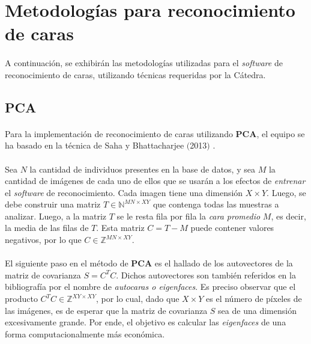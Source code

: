 \documentclass[12pt, twocolumn]{article}
\begin{document}
	\section{Metodologías para reconocimiento de caras}
	
	\paragraph{} A continuación, se exhibirán las metodologías utilizadas para el \textit{software} de reconocimiento de caras, utilizando técnicas requeridas por la Cátedra. 	
	
	\subsection{PCA}
	
	\paragraph{} Para la implementación de reconocimiento de caras utilizando \textbf{PCA}, el equipo se ha basado en la técnica de Saha y Bhattacharjee $($2013$)$ \cite{PCA}.
	
	\paragraph{} Sea $N$ la cantidad de individuos presentes en la base de datos, y sea $M$ la cantidad de imágenes de cada uno de ellos que se usarán a los efectos de \textit{entrenar} el \textit{software} de reconocimiento. Cada imagen tiene una dimensión $X\times Y$. Luego, se debe construir una matriz $T \in \mathbb{N}^{MN\times XY}$ que contenga todas las muestras a analizar. Luego, a la matriz $T$ se le resta fila por fila la \textit{cara promedio} $M$, es decir, la media de las filas de $T$. Esta matriz $C = T - M$ puede contener valores negativos, por lo que $C \in \mathbb{Z}^{MN\times XY}$.
	
	\paragraph{} El siguiente paso en el método de \textbf{PCA} es el hallado de los autovectores de la matriz de covarianza $S = C^{T}C$. Dichos autovectores son también referidos en la bibliografía por el nombre de \textit{autocaras o eigenfaces}. Es preciso observar que el producto $C^{T}C \in \mathbb{Z}^{XY\times XY}$, por lo cual, dado que $X\times Y$ es el número de píxeles de las imágenes, es de esperar que la matriz de covarianza $S$ sea de una dimensión excesivamente grande. Por ende, el objetivo es calcular las \textit{eigenfaces} de una forma computacionalmente más económica.
	
\end{document}
